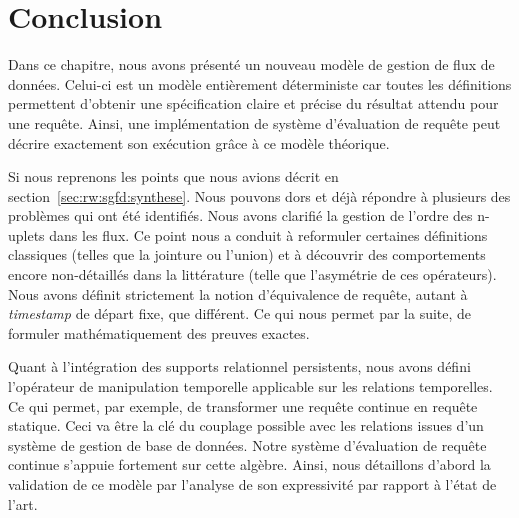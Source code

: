 \section{Conclusion}\label{sec:contrib:astral:conclusion}
Dans ce chapitre, nous avons présenté un nouveau modèle de gestion de flux de données. Celui-ci est un modèle entièrement déterministe car toutes les définitions permettent d'obtenir une spécification claire et précise du résultat attendu pour une requête. Ainsi, une implémentation de système d'évaluation de requête peut décrire exactement son exécution grâce à ce modèle théorique.

Si nous reprenons les points que nous avions décrit en section~\ref{sec:rw:sgfd:synthese}. Nous pouvons dors et déjà répondre à plusieurs des problèmes qui ont été identifiés. Nous avons clarifié la gestion de l'ordre des n-uplets dans les flux. Ce point nous a conduit à reformuler certaines définitions classiques (telles que la jointure ou l'union) et à découvrir des comportements encore non-détaillés dans la littérature (telle que l'asymétrie de ces opérateurs). Nous avons définit strictement la notion d'équivalence de requête, autant à \textit{timestamp} de départ fixe, que différent. Ce qui nous permet par la suite, de formuler mathématiquement des preuves exactes.

Quant à l'intégration des supports relationnel persistents, nous avons défini l'opérateur de manipulation temporelle applicable sur les relations temporelles. Ce qui permet, par exemple, de transformer une requête continue en requête statique. Ceci va être la clé du couplage possible avec les relations issues d'un système de gestion de base de données. Notre système d'évaluation de requête continue s'appuie fortement sur cette algèbre. Ainsi, nous détaillons d'abord la validation de ce modèle par l'analyse de son expressivité par rapport à l'état de l'art.